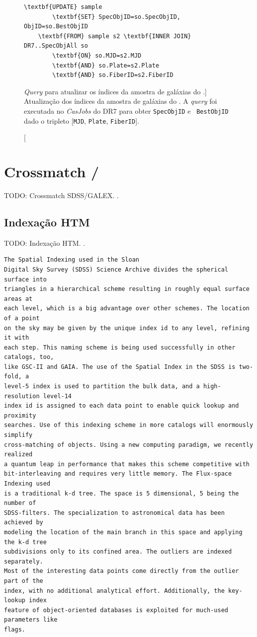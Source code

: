 \begin{figure}
	\begin{Verbatim}[commandchars=\\\{\}]
	\textbf{UPDATE} sample
		\textbf{SET} SpecObjID=so.SpecObjID, ObjID=so.BestObjID
	\textbf{FROM} sample s2 \textbf{INNER JOIN} DR7..SpecObjAll so
		\textbf{ON} so.MJD=s2.MJD
		\textbf{AND} so.Plate=s2.Plate
		\textbf{AND} so.FiberID=s2.FiberID
	\end{Verbatim}
	\caption
	[{\em Query} para atualizar os índices da amostra de galáxias do
	\starlight.]
	{Atualização dos índices da amostra de galáxias do \starlight. A {\em query}
	foi executada no {\em CasJobs} do \SDSS DR7 para obter {\tt SpecObjID} e {\tt
	BestObjID} dado o tripleto [{\tt MJD}, {\tt Plate}, {\tt FiberID}].}
	\label{fig:AtualizaObjIds}
\end{figure}


\section{Crossmatch \SDSS/\galex}
TODO: Crossmatch SDSS/GALEX. \citet{Budavari2009}.

\subsection{Indexação HTM}
TODO: Indexação HTM. \citet{Kunszt2000}.
\begin{verbatim}
The Spatial Indexing used in the Sloan
Digital Sky Survey (SDSS) Science Archive divides the spherical surface into
triangles in a hierarchical scheme resulting in roughly equal surface areas at
each level, which is a big advantage over other schemes. The location of a point
on the sky may be given by the unique index id to any level, refining it with
each step. This naming scheme is being used successfully in other catalogs, too,
like GSC-II and GAIA. The use of the Spatial Index in the SDSS is two-fold, a
level-5 index is used to partition the bulk data, and a high-resolution level-14
index id is assigned to each data point to enable quick lookup and proximity
searches. Use of this indexing scheme in more catalogs will enormously simplify
cross-matching of objects. Using a new computing paradigm, we recently realized
a quantum leap in performance that makes this scheme competitive with
bit-interleaving and requires very little memory. The Flux-space Indexing used
is a traditional k-d tree. The space is 5 dimensional, 5 being the number of
SDSS-filters. The specialization to astronomical data has been achieved by
modeling the location of the main branch in this space and applying the k-d tree
subdivisions only to its confined area. The outliers are indexed separately.
Most of the interesting data points come directly from the outlier part of the
index, with no additional analytical effort. Additionally, the key-lookup index
feature of object-oriented databases is exploited for much-used parameters like
flags.
\end{verbatim}

